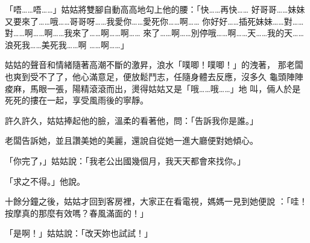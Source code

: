 「唔……唔……」姑姑將雙腳自動高高地勾上他的腰：「快……再快……
好哥哥……妹妹又要來了……哦……哥哥呀……我愛你……愛死你……啊……
你好好……插死妹妹……對……對……啊……啊……我來了……啊……啊……
來了……啊……別停哦……啊……天……我的天……浪死我……美死我……啊
……啊……」

姑姑的聲音和情緒隨著高潮不斷的激昇，浪水「噗唧！噗唧！」的洩著，
那老闆也爽到受不了了，他心滿意足，便放鬆鬥志，任隨身體去反應，沒多久
龜頭陣陣痠麻，馬眼一張，陽精滾滾而出，燙得姑姑又是「哦……哦……」地
叫，倆人於是死死的摟在一起，享受風雨後的寧靜。

許久許久，姑姑捧起他的臉，溫柔的看著他，問：「告訴我你是誰。」

老闆告訴她，並且讚美她的美麗，還說自從她一進大廳便對她傾心。

「你完了，」姑姑說：「我老公出國幾個月，我天天都會來找你。」

「求之不得。」他說。

十餘分鐘之後，姑姑才回到客房裡，大家正在看電視，媽媽一見到她便說
：「哇！按摩真的那麼有效嗎？春風滿面的！」

「是啊！」姑姑說：「改天妳也試試！」










